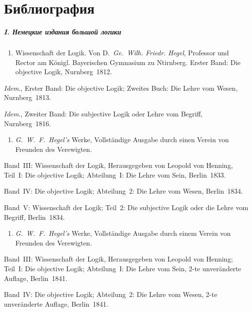 \bigskip
\clearpage

\chapter[Библиография]{Библиография}

\paragraph%
[I. Немецкие издания большой логики]%
{I. Немецкие издания большой логики}

\begin{enumerate}
\item
Wissen\-schaft der Logik. Von D.~{\em Ge.~Wilh. Friedr. Hegel},
Professor und Rector am Königl. Bayeri\-schen Gymnasium zu Ntirnberg.
Erster Band: Die objective Logik, Nurnberg~1812.
\end{enumerate}

{\em Idem}., Erster Band: Die objective Logik; Zweites Buch: Die Lehre
vom Wesen, Nurnberg~1813.

{\em Idem}., Zweiter Band: Die subjective Logik oder Lehre vom Begriff,
Nurnberg~1816.

\begin{enumerate}
\item
{\em G.~W.~F.~Hegel's} Werke, Vollstän\-dige Ausgabe durch einen Verein von
Freunden des Verewigten.
\end{enumerate}

Band~III: Wissen\-schaft der Logik, Heraus\-gegeben von
Leopold von Henning, Teil~I: Die objective Logik; Abteilung~I: Die Lehre
vom Sein, Berlin~1833.

Band~IV: Die objective Logik; Abteilung~2: Die Lehre vom Wesen, Berlin~1834.

Band~V: Wissen\-schaft der Logik; Teil~2: Die subjective Logik oder die Lehre
vom Begriff, Berlin~1834.

\begin{enumerate}
\item
{\em G.~W.~F.~Hegel's} Werke, Voll\-ständige Ausgabe durch einem Verein von
Freunden des Verewigten.
\end{enumerate}

Band~III: Wissen\-schaft der Logik, Heraus\-gegeben von Leopold von Henning;
Teil~I: Die objective Logik; Abteilung~I: Die Lehre vom Sein, 2-te
unver\-änderte Auflage, Berlin~1841.

Band~IV: Die objective Logik; Abteilung~2: Die Lehre vom Wesen, 2-te
unver\-änderte Auflage, Berlin~1841.

